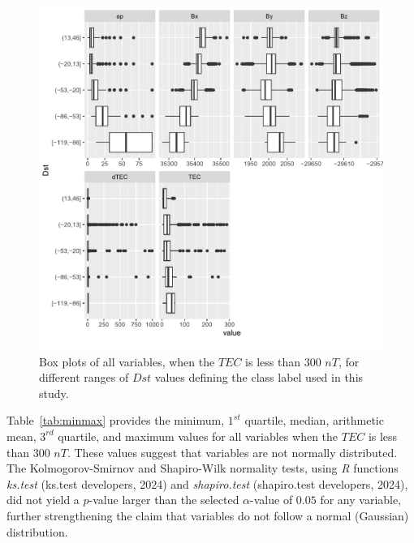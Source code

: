 \documentclass[sn-mathphys-num]{sn-jnl}%
\begin{document}
\begin{figure}
    \centering
    \includegraphics[width=0.9\linewidth]{iono3boxplot_fix.pdf}
    \caption{Box plots of all variables, when the $TEC$ is less than $300$ $nT$, for different ranges of $Dst$ values defining the class label used in this study.}
    \label{fig:iono3boxplot}
\end{figure}

Table~\ref{tab:minmax} provides the minimum, $1^{st}$ quartile, median, arithmetic mean, $3^{rd}$ quartile, and maximum values for all variables when the $TEC$ is less than $300$ $nT$. These values suggest that variables are not normally distributed. The Kolmogorov-Smirnov and Shapiro-Wilk normality tests, using \textit{R} functions \textit{ks.test} (ks.test developers, 2024) and \textit{shapiro.test} (shapiro.test developers, 2024), did not yield a $p$-value larger than the selected $\alpha$-value of $0.05$ for any variable, further strengthening the claim that variables do not follow a normal (Gaussian) distribution. 
\end{document}
